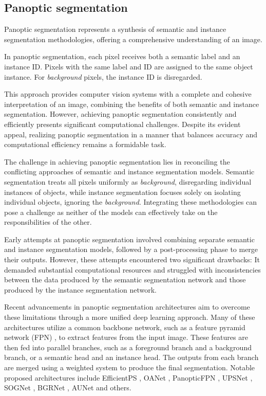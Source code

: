   \subsection{Panoptic segmentation}
Panoptic segmentation represents a synthesis of semantic and instance segmentation methodologies, offering a comprehensive understanding of an image.

In panoptic segmentation, each pixel receives both a semantic label and an instance ID. Pixels with the same label and ID are assigned to the same object instance. For \textit{background} pixels, the instance ID is disregarded.

This approach provides computer vision systems with a complete and cohesive interpretation of an image, combining the benefits of both semantic and instance segmentation. However, achieving panoptic segmentation consistently and efficiently presents significant computational challenges. Despite its evident appeal, realizing panoptic segmentation in a manner that balances accuracy and computational efficiency remains a formidable task.

The challenge in achieving panoptic segmentation lies in reconciling the conflicting approaches of semantic and
instance segmentation models. Semantic segmentation treats all pixels uniformly as \textit{background}, disregarding
individual instances of objects, while instance segmentation focuses solely on isolating individual objects, ignoring
the \textit{background}. Integrating these methodologies can pose a challenge as neither of the models can effectively
take on the responsibilities of the other.

Early attempts at panoptic segmentation involved combining separate semantic and instance segmentation models,
followed by a post-processing phase to merge their outputs. However, these attempts encountered two significant
drawbacks: It
demanded substantial computational resources and struggled with inconsistencies between the data produced by the
semantic segmentation network and those produced by the instance segmentation network.

Recent advancements in panoptic segmentation architectures aim to overcome these limitations through a more unified deep learning approach. Many of these architectures utilize a common backbone network, such as a feature pyramid network (FPN) \cite{FPNLin2017}, to extract features from the input image. These features are then fed into parallel branches, such as a foreground branch and a background branch, or a semantic head and an instance head. The outputs from each branch are merged using a weighted system to produce the final segmentation. Notable proposed architectures include EfficientPS \cite{mohan2020efficientps}, OANet \cite{zhang2019oanet}, PanopticFPN \cite{kirillov2019panoptic}, UPSNet \cite{xiong2019upsnet}, SOGNet \cite{yang2019sognet}, BGRNet \cite{wu2020bidirectional}, AUNet \cite{sun2019aunet} and others.


